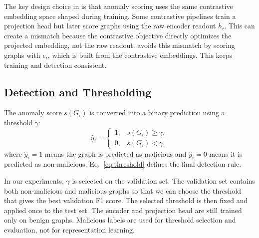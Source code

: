 The key design choice in \sysname{} is that anomaly scoring uses the same contrastive embedding space shaped during training. Some contrastive pipelines train a projection head but later score graphs using the raw encoder readout $h_i$. This can create a mismatch because the contrastive objective directly optimizes the projected embedding, not the raw readout. \sysname{} avoids this mismatch by scoring graphs with $e_i$, which is built from the contrastive embeddings. This keeps training and detection consistent.

\subsection{Detection and Thresholding}

The anomaly score $s(G_i)$ is converted into a binary prediction using a threshold $\gamma$:
\begin{equation}
    \hat{y}_i =
    \begin{cases}
    1, & s(G_i) \geq \gamma,\\
    0, & s(G_i) < \gamma,
    \end{cases}
    \label{eq:threshold}
\end{equation}
where $\hat{y}_i=1$ means the graph is predicted as malicious and $\hat{y}_i=0$ means it is predicted as non-malicious. Eq.~\eqref{eq:threshold} defines the final detection rule.

In our experiments, $\gamma$ is selected on the validation set. The validation set contains both non-malicious and malicious graphs so that we can choose the threshold that gives the best validation F1 score. The selected threshold is then fixed and applied once to the test set. The encoder and projection head are still trained only on benign graphs. Malicious labels are used for threshold selection and evaluation, not for representation learning.
